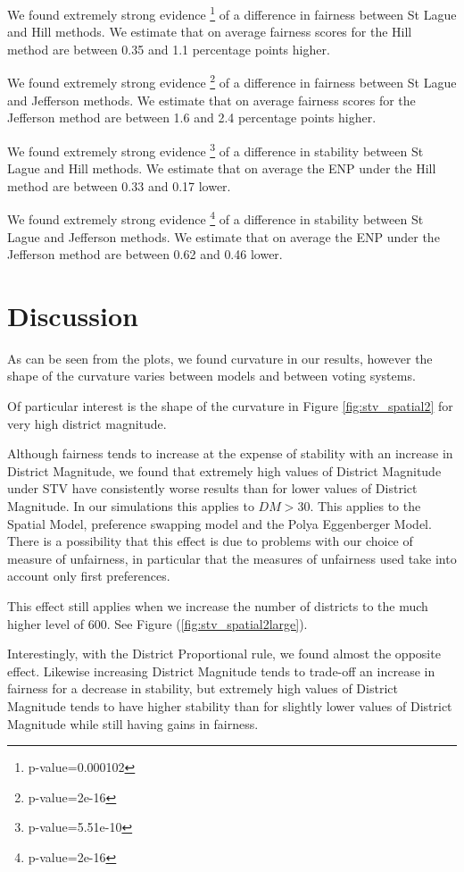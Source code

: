 \documentclass{article}
\begin{document}
We found extremely strong evidence \footnote{p-value=0.000102} of a difference in fairness between St Lague and Hill methods. We estimate that on average fairness scores for the Hill method are between 0.35 and 1.1 percentage points higher.

We found extremely strong evidence \footnote{p-value=2e-16} of a difference in fairness between St Lague and Jefferson methods. We estimate that on average fairness scores for the Jefferson method are between 1.6 and 2.4 percentage points higher.

We found extremely strong evidence \footnote{p-value=5.51e-10} of a difference in stability between St Lague and Hill methods. We estimate that on average the ENP under the Hill method are between 0.33 and 0.17 lower.

We found extremely strong evidence \footnote{p-value=2e-16} of a difference in stability between St Lague and Jefferson methods. We estimate that on average the ENP under the Jefferson method are between 0.62 and 0.46 lower.

\newpage
\section{Discussion}
As can be seen from the plots, we found curvature in our results, however the shape of the curvature varies between models and between voting systems.

Of particular interest is the shape of the curvature in Figure \ref{fig:stv_spatial2} for very high district magnitude.

Although fairness tends to increase at the expense of stability with an increase in District Magnitude, we found that extremely high values of District Magnitude under STV have consistently worse results than for lower values of District Magnitude. In our simulations this applies to $DM>30$. This applies to the Spatial Model, preference swapping model and the Polya Eggenberger Model. There is a possibility that this effect is due to problems with our choice of measure of unfairness, in particular that the measures of unfairness used take into account only first preferences.

This effect still applies when we increase the number of districts to the much higher level of $600$. See Figure (\ref{fig:stv_spatial2large}).

Interestingly, with the District Proportional rule, we found almost the opposite effect. Likewise increasing District Magnitude tends to trade-off an increase in fairness for a decrease in stability, but extremely high values of District Magnitude tends to have higher stability than for slightly lower values of District Magnitude while still having gains in fairness.
\end{document}
